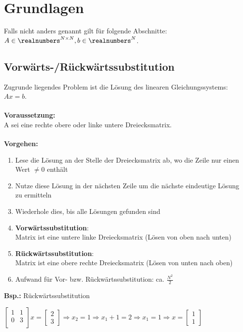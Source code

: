 \section{Grundlagen}%
\label{gl:sec:grundlagen}
Falls nicht anders genannt gilt für folgende Abschnitte: $A \in \realnumbers^{N \times N}, b \in \realnumbers^N$.

\subsection{Vorwärts-/Rückwärtssubstitution}%
\label{gl:sub:substitution}
Zugrunde liegendes Problem ist die Lösung des linearen Gleichungssystems: $Ax = b$.\\\\
\textbf{Voraussetzung:}\\A sei eine rechte obere oder linke untere Dreiecksmatrix.\\\\
\textbf{Vorgehen:}
\begin{enumerate}
	\item Lese die Lösung an der Stelle der Dreiecksmatrix ab, wo die Zeile nur einen Wert $\neq 0$ enthält
	\item Nutze diese Lösung in der nächsten Zeile um die nächste eindeutige Lösung zu ermitteln
	\item Wiederhole dies, bis alle Lösungen gefunden sind
	\item \textbf{Vorwärtssubstitution}:\\Matrix ist eine untere linke Dreiecksmatrix (Lösen von oben nach unten)
	\item \textbf{Rückwärtssubstitution}:\\Matrix ist eine obere rechte Dreiecksmatrix (Lösen von unten nach oben)
	\item Aufwand für Vor- bzw. Rückwärtssubstitution: ca. $\frac{N^2}{2}$
\end{enumerate}
\textbf{Bsp.:} Rückwärtssubstitution
\begin{center}
	$\begin{bmatrix} 1 & 1\\0 & 3\\\end{bmatrix}x = \begin{bmatrix}2 \\ 3\end{bmatrix} \Rightarrow
	x_2 = 1 \Rightarrow x_1 + 1 = 2 \Rightarrow x_1 = 1 \Rightarrow x = \begin{bmatrix}1 \\ 1\end{bmatrix}$
\end{center}

